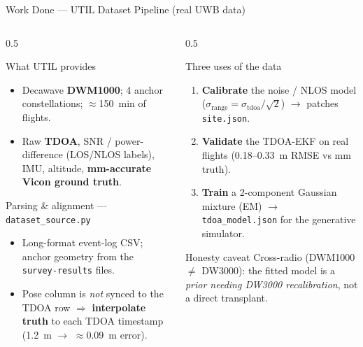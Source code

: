 \documentclass[aspectratio=169,10pt]{beamer}
\begin{document}
\begin{frame}{Work Done --- UTIL Dataset Pipeline (real UWB data)}
  \begin{columns}[T]
    \begin{column}{0.5\textwidth}
      \begin{block}{What UTIL provides}
        \footnotesize
        \begin{itemize}\small
          \item Decawave \textbf{DWM1000}; 4 anchor constellations; $\approx$150~min of flights.
          \item Raw \textbf{TDOA}, SNR / power-difference (LOS/NLOS labels), IMU, altitude,
                \textbf{mm-accurate Vicon ground truth}.
        \end{itemize}
      \end{block}
      \begin{block}{Parsing \& alignment --- \texttt{dataset\_source.py}}
        \footnotesize
        \begin{itemize}\small
          \item Long-format event-log CSV; anchor geometry from the \texttt{survey-results} files.
          \item Pose column is \emph{not} synced to the TDOA row $\Rightarrow$ \textbf{interpolate truth}
                to each TDOA timestamp (1.2~m $\rightarrow$ $\approx$0.09~m error).
        \end{itemize}
      \end{block}
    \end{column}
    \begin{column}{0.5\textwidth}
      \begin{block}{Three uses of the data}
        \footnotesize
        \begin{enumerate}\small
          \item \textbf{Calibrate} the noise / NLOS model ($\sigma_{\text{range}}=\sigma_{\text{tdoa}}/\sqrt{2}$)
                $\rightarrow$ patches \texttt{site.json}.
          \item \textbf{Validate} the TDOA-EKF on real flights (0.18--0.33~m RMSE vs mm truth).
          \item \textbf{Train} a 2-component Gaussian mixture (EM) $\rightarrow$ \texttt{tdoa\_model.json}
                for the generative simulator.
        \end{enumerate}
      \end{block}
      \begin{block}{Honesty caveat}
        \footnotesize Cross-radio (DWM1000 $\neq$ DW3000): the fitted model is a \emph{prior needing
        DW3000 recalibration}, not a direct transplant.
      \end{block}
    \end{column}
  \end{columns}
\end{frame}
\end{document}
